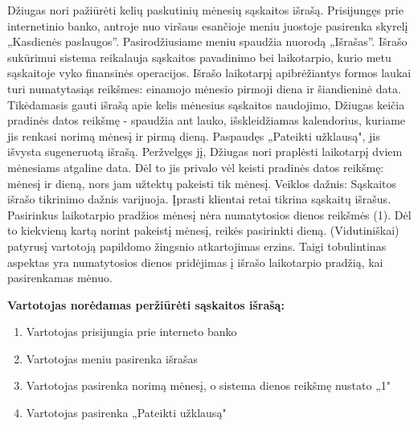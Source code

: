 \documentclass{VUMIFPSkursinis}
\begin{document}
Džiugas nori pažiūrėti kelių paskutinių mėnesių sąskaitos išrašą. Prisijungęs prie internetinio banko, antroje nuo viršaus esančioje meniu juostoje pasirenka skyrelį „Kasdienės paslaugos”. Pasirodžiusiame meniu spaudžia nuorodą „Išrašas”. Išrašo sukūrimui sistema reikalauja sąskaitos pavadinimo bei laikotarpio, kurio metu sąskaitoje vyko finansinės operacijos. Išrašo laikotarpį apibrėžiantys formos laukai turi numatytasiąs reikšmes: einamojo mėnesio pirmoji diena ir šiandieninė data. Tikėdamasis gauti išrašą apie kelis mėnesius sąskaitos naudojimo, Džiugas keičia pradinės datos reikšmę - spaudžia ant lauko, išskleidžiamas kalendorius, kuriame jis renkasi norimą mėnesį ir pirmą dieną. Paspaudęs „Pateikti užklausą", jis išvysta sugeneruotą išrašą. Peržvelgęs jį, Džiugas nori praplėsti laikotarpį dviem mėnesiams atgaline data. Dėl to jis privalo vėl keisti pradinės datos reikšmę: mėnesį ir dieną, nors jam užtektų pakeisti tik mėnesį.
Veiklos dažnis: Sąskaitos išrašo tikrinimo dažnis varijuoja. Įprasti klientai retai tikrina sąskaitų išrašus. 
Pasirinkus laikotarpio pradžios mėnesį nėra numatytosios dienos reikšmės (1). Dėl to kiekvieną kartą norint pakeistį mėnesį, reikės pasirinkti dieną. (Vidutiniškai) patyrusį vartotoją papildomo žingsnio atkartojimas erzins. Taigi tobulintinas aspektas yra numatytosios dienos pridėjimas į išrašo laikotarpio pradžią, kai pasirenkamas mėnuo.
\begin{center}
	\textbf{Vartotojas norėdamas peržiūrėti sąskaitos išrašą:}
\end{center}
\begin{enumerate}
	\item Vartotojas prisijungia prie interneto banko
	\item Vartotojas meniu pasirenka išrašas
	\item Vartotojas pasirenka norimą mėnesį, o sistema dienos reikšmę nustato „1"
	\item Vartotojas pasirenka „Pateikti užklausą"
\end{enumerate}
\end{document}
